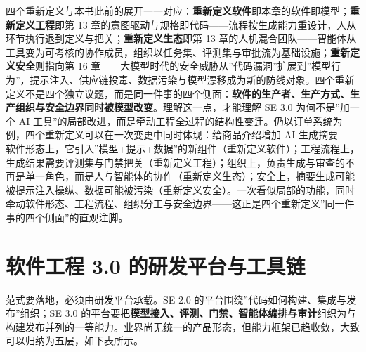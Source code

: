 \documentclass[12pt,a4paper,twoside,openany]{ctexbook}
\numberwithin{figure}{chapter}
\numberwithin{table}{chapter}
\begin{document}
四个重新定义与本书此前的展开一一对应：\textbf{重新定义软件}即本章的软件即模型；\textbf{重新定义工程}即第
13
章的意图驱动与规格即代码------流程按生成能力重设计，人从环节执行退到定义与把关；\textbf{重新定义生态}即第
13
章的人机混合团队------智能体从工具变为可考核的协作成员，组织以任务集、评测集与审批流为基础设施；\textbf{重新定义安全}则指向第
16
章------大模型时代的安全威胁从''代码漏洞''扩展到''模型行为''，提示注入、供应链投毒、数据污染与模型漂移成为新的防线对象。四个重新定义不是四个独立议题，而是同一件事的四个侧面：\textbf{软件的生产者、生产方式、生产组织与安全边界同时被模型改变}。理解这一点，才能理解
SE 3.0 为何不是''加一个 AI
工具''的局部改进，而是牵动工程全过程的结构性变迁。仍以订单系统为例，四个重新定义可以在一次变更中同时体现：给商品介绍增加
AI
生成摘要------软件形态上，它引入''模型+提示+数据''的新组件（重新定义软件）；工程流程上，生成结果需要评测集与门禁把关（重新定义工程）；组织上，负责生成与审查的不再是单一角色，而是人与智能体的协作（重新定义生态）；安全上，摘要生成可能被提示注入操纵、数据可能被污染（重新定义安全）。一次看似局部的功能，同时牵动软件形态、工程流程、组织分工与安全边界------这正是四个重新定义''同一件事的四个侧面''的直观注脚。

\section{软件工程 3.0
的研发平台与工具链}\label{ux8f6fux4ef6ux5de5ux7a0b-3.0-ux7684ux7814ux53d1ux5e73ux53f0ux4e0eux5de5ux5177ux94fe}

范式要落地，必须由研发平台承载。SE 2.0
的平台围绕''代码如何构建、集成与发布''组织；SE 3.0
的平台要把\textbf{模型接入、评测、门禁、智能体编排与审计}组织为与构建发布并列的一等能力。业界尚无统一的产品形态，但能力框架已趋收敛，大致可以归纳为五层，如下表所示。
\end{document}
